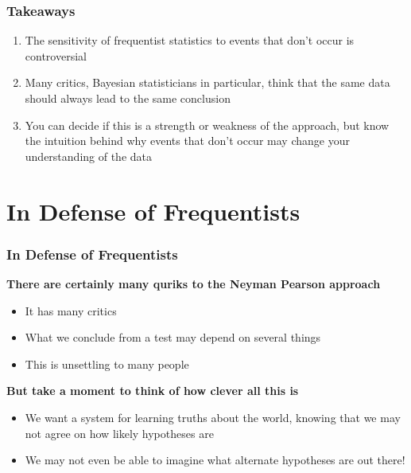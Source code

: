 \documentclass[10pt, block=fill]{beamer}
\begin{document}
\begin{frame}
    \frametitle{Takeaways}
    
    \begin{enumerate}
        \item The sensitivity of frequentist statistics to events that don't occur is controversial
        \item Many critics, Bayesian statisticians in particular, think that the same data should always lead to the same conclusion
        \item You can decide if this is a strength or weakness of the approach, but know the intuition behind why events that don't occur may change your understanding of the data
    \end{enumerate}
\end{frame}


\section{In Defense of Frequentists}

\begin{frame}
    \frametitle{In Defense of Frequentists}
    
    \textbf{There are certainly many quriks to the Neyman Pearson approach}
    \begin{itemize}
        \item It has many critics
        \item What we conclude from a test may depend on several things
        \item This is unsettling to many people
    \end{itemize}
    
    \textbf{But take a moment to think of how clever all this is}
    \begin{itemize}
        \item We want a system for learning truths about the world, knowing that we may not agree on how likely hypotheses are
        \item We may not even be able to imagine what alternate hypotheses are out there!
    \end{itemize}
    
\end{frame}
\end{document}
